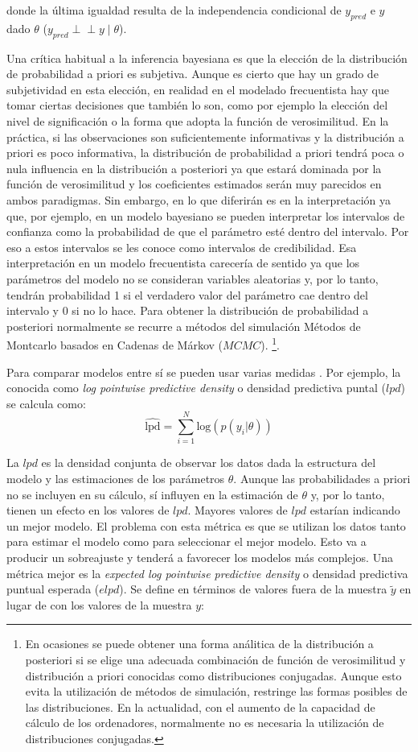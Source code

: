 \documentclass[
  12pt,
  a4paper,
  extrafontsizes,
  onecolumn,
  openright,
  table]{memoir}
\begin{document}
donde la última igualdad resulta de la independencia condicional de
\(y_{pred}\) e \(y\) dado \(\theta\)
(\(y_{pred} \perp\!\!\!\perp y \mid \theta\)).

Una crítica habitual a la inferencia bayesiana es que la elección de la
distribución de probabilidad a priori es subjetiva. Aunque es cierto que
hay un grado de subjetividad en esta elección, en realidad en el
modelado frecuentista hay que tomar ciertas decisiones que también lo
son, como por ejemplo la elección del nivel de significación o la forma
que adopta la función de verosimilitud. En la práctica, si las
observaciones son suficientemente informativas y la distribución a
priori es poco informativa, la distribución de probabilidad a priori
tendrá poca o nula influencia en la distribución a posteriori ya que
estará dominada por la función de verosimilitud y los coeficientes
estimados serán muy parecidos en ambos paradigmas. Sin embargo, en lo
que diferirán es en la interpretación ya que, por ejemplo, en un modelo
bayesiano se pueden interpretar los intervalos de confianza como la
probabilidad de que el parámetro esté dentro del intervalo. Por eso a
estos intervalos se les conoce como intervalos de credibilidad. Esa
interpretación en un modelo frecuentista carecería de sentido ya que los
parámetros del modelo no se consideran variables aleatorias y, por lo
tanto, tendrán probabilidad 1 si el verdadero valor del parámetro cae
dentro del intervalo y 0 si no lo hace. Para obtener la distribución de
probabilidad a posteriori normalmente se recurre a métodos del
simulación Métodos de Montcarlo basados en Cadenas de Márkov (\(MCMC\)).
\footnote{En ocasiones se puede obtener una forma análitica de la
  distribución a posteriori si se elige una adecuada combinación de
  función de verosimilitud y distribución a priori conocidas como
  distribuciones conjugadas. Aunque esto evita la utilización de métodos
  de simulación, restringe las formas posibles de las distribuciones. En
  la actualidad, con el aumento de la capacidad de cálculo de los
  ordenadores, normalmente no es necesaria la utilización de
  distribuciones conjugadas.}.

Para comparar modelos entre sí se pueden usar varias medidas
\autocite[ver][]{barreda2023}. Por ejemplo, la conocida como \emph{log
pointwise predictive density} o densidad predictiva puntal (\(lpd\)) se
calcula como: \[
\widehat{\mathrm{lpd}} = \sum_{i=1}^{N} \mathrm{log} (p(y_{i} | \theta))
\]

La \(lpd\) es la densidad conjunta de observar los datos dada la
estructura del modelo y las estimaciones de los parámetros \(\theta\).
Aunque las probabilidades a priori no se incluyen en su cálculo, sí
influyen en la estimación de \(\theta\) y, por lo tanto, tienen un
efecto en los valores de \(lpd\). Mayores valores de \(lpd\) estarían
indicando un mejor modelo. El problema con esta métrica es que se
utilizan los datos tanto para estimar el modelo como para seleccionar el
mejor modelo. Esto va a producir un sobreajuste y tenderá a favorecer
los modelos más complejos. Una métrica mejor es la \emph{expected log
pointwise predictive density} o densidad predictiva puntual esperada
(\(elpd\)). Se define en términos de valores fuera de la muestra
\(\tilde{y}\) en lugar de con los valores de la muestra \(y\):
\end{document}
